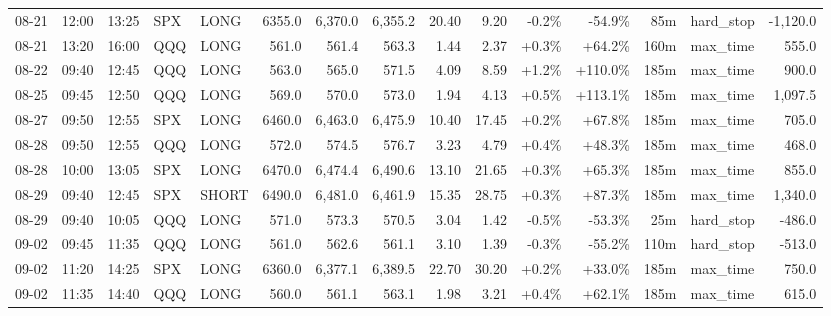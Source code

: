 \documentclass[11pt,a4paper,twoside]{article}
\begin{document}
\begin{landscape}
\begin{center}
\begin{longtable}{>{\color{txtmain}}l l l l l r r r r r r r r >{\color{txtmain}}l r}
08-21 & 12:00 & 13:25 & SPX & LONG & 6355.0 & 6,370.0 & 6,355.2 & 20.40 & 9.20 & \textcolor{lossred}{-0.2\%} & \textcolor{lossred}{-54.9\%} & 85m & hard\_stop & \textcolor{lossred}{-1,120.0} \\
08-21 & 13:20 & 16:00 & QQQ & LONG & 561.0 & 561.4 & 563.3 & 1.44 & 2.37 & \textcolor{wingreen}{+0.3\%} & \textcolor{wingreen}{+64.2\%} & 160m & max\_time & \textcolor{wingreen}{555.0} \\
08-22 & 09:40 & 12:45 & QQQ & LONG & 563.0 & 565.0 & 571.5 & 4.09 & 8.59 & \textcolor{wingreen}{+1.2\%} & \textcolor{wingreen}{+110.0\%} & 185m & max\_time & \textcolor{wingreen}{900.0} \\
08-25 & 09:45 & 12:50 & QQQ & LONG & 569.0 & 570.0 & 573.0 & 1.94 & 4.13 & \textcolor{wingreen}{+0.5\%} & \textcolor{wingreen}{+113.1\%} & 185m & max\_time & \textcolor{wingreen}{1,097.5} \\
08-27 & 09:50 & 12:55 & SPX & LONG & 6460.0 & 6,463.0 & 6,475.9 & 10.40 & 17.45 & \textcolor{wingreen}{+0.2\%} & \textcolor{wingreen}{+67.8\%} & 185m & max\_time & \textcolor{wingreen}{705.0} \\
08-28 & 09:50 & 12:55 & QQQ & LONG & 572.0 & 574.5 & 576.7 & 3.23 & 4.79 & \textcolor{wingreen}{+0.4\%} & \textcolor{wingreen}{+48.3\%} & 185m & max\_time & \textcolor{wingreen}{468.0} \\
08-28 & 10:00 & 13:05 & SPX & LONG & 6470.0 & 6,474.4 & 6,490.6 & 13.10 & 21.65 & \textcolor{wingreen}{+0.3\%} & \textcolor{wingreen}{+65.3\%} & 185m & max\_time & \textcolor{wingreen}{855.0} \\
08-29 & 09:40 & 12:45 & SPX & SHORT & 6490.0 & 6,481.0 & 6,461.9 & 15.35 & 28.75 & \textcolor{wingreen}{+0.3\%} & \textcolor{wingreen}{+87.3\%} & 185m & max\_time & \textcolor{wingreen}{1,340.0} \\
08-29 & 09:40 & 10:05 & QQQ & LONG & 571.0 & 573.3 & 570.5 & 3.04 & 1.42 & \textcolor{lossred}{-0.5\%} & \textcolor{lossred}{-53.3\%} & 25m & hard\_stop & \textcolor{lossred}{-486.0} \\
09-02 & 09:45 & 11:35 & QQQ & LONG & 561.0 & 562.6 & 561.1 & 3.10 & 1.39 & \textcolor{lossred}{-0.3\%} & \textcolor{lossred}{-55.2\%} & 110m & hard\_stop & \textcolor{lossred}{-513.0} \\
09-02 & 11:20 & 14:25 & SPX & LONG & 6360.0 & 6,377.1 & 6,389.5 & 22.70 & 30.20 & \textcolor{wingreen}{+0.2\%} & \textcolor{wingreen}{+33.0\%} & 185m & max\_time & \textcolor{wingreen}{750.0} \\
09-02 & 11:35 & 14:40 & QQQ & LONG & 560.0 & 561.1 & 563.1 & 1.98 & 3.21 & \textcolor{wingreen}{+0.4\%} & \textcolor{wingreen}{+62.1\%} & 185m & max\_time & \textcolor{wingreen}{615.0} \\

\end{longtable}
\end{center}
\end{landscape}
\end{document}
